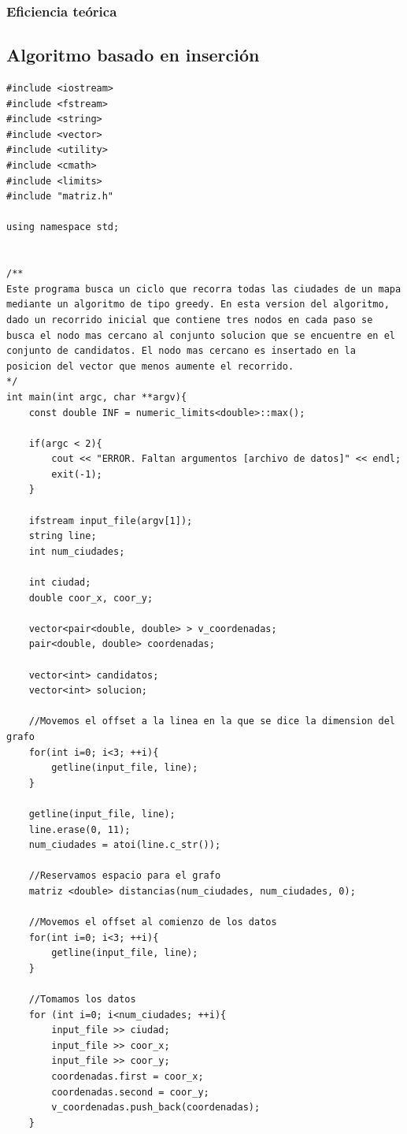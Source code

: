 \documentclass[11pt,a4paper]{article} %
\begin{document}
\subsubsection{Eficiencia teórica}





\newpage
\subsection{Algoritmo basado en inserción}
\begin{lstlisting}[style=C++]
#include <iostream>
#include <fstream>
#include <string>
#include <vector>
#include <utility>
#include <cmath>
#include <limits>
#include "matriz.h"

using namespace std;


/**
Este programa busca un ciclo que recorra todas las ciudades de un mapa mediante un algoritmo de tipo greedy. En esta version del algoritmo, dado un recorrido inicial que contiene tres nodos en cada paso se busca el nodo mas cercano al conjunto solucion que se encuentre en el conjunto de candidatos. El nodo mas cercano es insertado en la posicion del vector que menos aumente el recorrido.
*/
int main(int argc, char **argv){
	const double INF = numeric_limits<double>::max();
	
	if(argc < 2){
		cout << "ERROR. Faltan argumentos [archivo de datos]" << endl;
		exit(-1);
	}
	
	ifstream input_file(argv[1]);
	string line;
	int num_ciudades;
	
	int ciudad;
	double coor_x, coor_y;
	
	vector<pair<double, double> > v_coordenadas;
	pair<double, double> coordenadas;
	
	vector<int> candidatos;
	vector<int> solucion;
	
	//Movemos el offset a la linea en la que se dice la dimension del grafo
	for(int i=0; i<3; ++i){
		getline(input_file, line);
	}
	
	getline(input_file, line);
	line.erase(0, 11);
	num_ciudades = atoi(line.c_str());
	
	//Reservamos espacio para el grafo
	matriz <double> distancias(num_ciudades, num_ciudades, 0);
	
	//Movemos el offset al comienzo de los datos
	for(int i=0; i<3; ++i){
		getline(input_file, line);
	}
	
	//Tomamos los datos
	for (int i=0; i<num_ciudades; ++i){
		input_file >> ciudad;
		input_file >> coor_x;
		input_file >> coor_y;
		coordenadas.first = coor_x;
		coordenadas.second = coor_y;
		v_coordenadas.push_back(coordenadas);
	}
	

\end{lstlisting}
\end{document}
